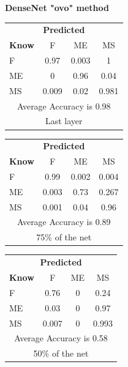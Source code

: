 \documentclass[12pt]{article} %
\begin{document}
\begin{center}
\textbf{ DenseNet "ovo" method}
\end{center}
\begin{minipage}{0.5\textwidth}
\begin{center}
\begin{tabular}{l|c|c|c|}
 \multicolumn{4}{c}{ \textbf{ Predicted}}\\
 \textbf{Know}&F&ME&MS\\ \hline\hline
F   &0.97&0.003&1\\
ME &0&0.96&0.04\\
MS &0.009&0.02&0.981\\
\multicolumn{4}{c}{Average Accuracy is 0.98}\\
\multicolumn{4}{c}{Last layer}\\
\end{tabular}
\end{center}
\end{minipage}
\begin{minipage}{0.5\textwidth}
\begin{center}
\begin{tabular}{l|c|c|c|}
 \multicolumn{4}{c}{ \textbf{ Predicted}}\\
 \textbf{Know}&F&ME&MS\\ \hline\hline
F    &0.99&0.002&0.004\\
ME &0.003&0.73&0.267\\
MS &0.001&0.04&0.96\\
\multicolumn{4}{c}{Average Accuracy is 0.89}\\
\multicolumn{4}{c}{75\%  of the net}\\
\end{tabular}
\end{center}
\end{minipage}
\begin{minipage}{0.5\textwidth}
\begin{center}
\begin{tabular}{l|c|c|c|}
 \multicolumn{4}{c}{ \textbf{ Predicted}}\\
 \textbf{Know}&F&ME&MS\\ \hline\hline
F   &0.76&0&0.24\\
ME &0.03&0&0.97\\
MS &0.007&0&0.993\\
\multicolumn{4}{c}{Average Accuracy is 0.58}\\
\multicolumn{4}{c}{50\%  of the net}\\
\end{tabular}
\end{center}
\end{minipage}
\end{document}
